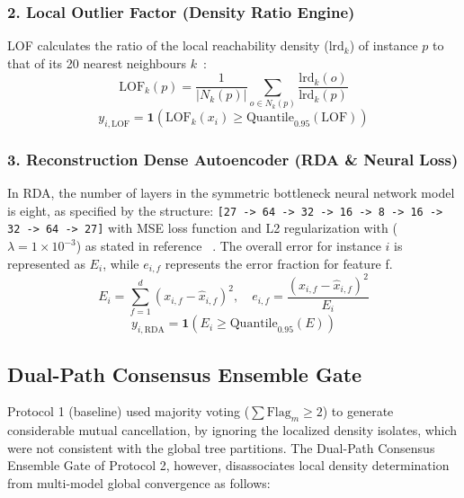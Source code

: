 \documentclass[conference]{IEEEtran}
\begin{document}
\subsubsection{2. Local Outlier Factor (Density Ratio Engine)}

LOF calculates the ratio of the local reachability density ($\text{lrd}_k$) of instance $p$ to that of its 20 nearest neighbours $k$~\cite{ref24}:
\begin{equation}
\mathrm{LOF}_k(p) = \frac{1}{|N_k(p)|} \sum_{o \in N_k(p)} \frac{\mathrm{lrd}_k(o)}{\mathrm{lrd}_k(p)}
\end{equation}
\begin{equation}
y_{i, \mathrm{LOF}} = \mathbf{1}\left(\mathrm{LOF}_k(x_i) \ge \mathrm{Quantile}_{0.95}(\mathrm{LOF})\right)
\end{equation}

\subsubsection{3. Reconstruction Dense Autoencoder (RDA \& Neural Loss)}
In RDA, the number of layers in the symmetric bottleneck neural network model is eight, as specified by the structure:  \texttt{[27 -> 64 -> 32 -> 16 -> 8 -> 16 -> 32 -> 64 -> 27]} with MSE loss function and L2 regularization with ($\lambda = 1\times 10^{-3}$) as stated in reference ~\cite{ref32}. The overall error for instance $i$ is represented as $E_i$, while $e_{i,f}$ represents the error fraction for feature f.
\begin{equation}
E_i = \sum_{f=1}^{d} (x_{i,f} - \hat{x}_{i,f})^2, \quad e_{i,f} = \frac{(x_{i,f} - \hat{x}_{i,f})^2}{E_i}
\end{equation}
\begin{equation}
y_{i, \mathrm{RDA}} = \mathbf{1}\left(E_i \ge \mathrm{Quantile}_{0.95}(E)\right)
\end{equation}

\subsection{Dual-Path Consensus Ensemble Gate}

Protocol 1 (baseline) used majority voting ($\sum \text{Flag}_m \ge 2$) to generate considerable mutual cancellation, by ignoring the localized density isolates, which were not consistent with the global tree partitions. The Dual-Path Consensus Ensemble Gate of Protocol 2, however, disassociates local density determination from multi-model global convergence as follows:
\end{document}
